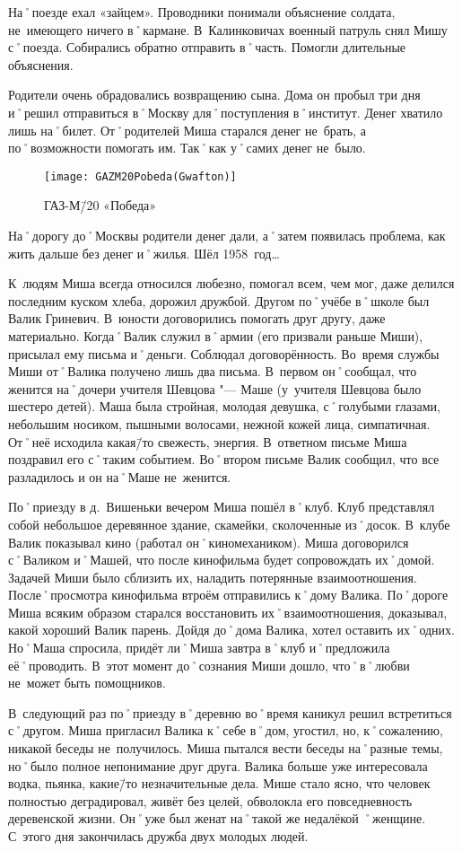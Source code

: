 На˚поезде ехал «зайцем». Проводники понимали объяснение солдата, не~имеющего ничего в˚кармане. В~Калинковичах военный патруль снял Мишу с˚поезда. Собирались обратно отправить в˚часть. Помогли длительные объяснения.

Родители очень обрадовались возвращению сына. Дома он пробыл три дня и˚решил отправиться в˚Москву для˚поступления в˚институт. Денег хватило лишь на˚билет. От˚родителей Миша старался денег не~брать, а по˚возможности помогать им. Так˚как у˚самих денег не~было.

\begin{wrapfigure}{O}{.4\textwidth}
\centering
\texttt{[image: GAZM20Pobeda(Gwafton)]}
\caption[ГАЗ-М\=/20 «Победа»]{ГАЗ-М\=/20 «Победа»\footnotemark}
\label{fig:GAZM20Pobeda(Gwafton)}
\end{wrapfigure}

На˚дорогу до˚Москвы родители денег дали, а˚затем появилась проблема, как жить дальше без денег и˚жилья. Шёл 1958~год…

К~людям Миша всегда относился любезно, помогал всем, чем мог, даже делился последним куском хлеба, дорожил дружбой. Другом по˚учёбе в˚школе был Валик Гриневич. В~юности договорились помогать друг другу, даже материально. Когда˚Валик служил в˚армии (его призвали раньше Миши), присылал ему письма и˚деньги. Соблюдал договорённость. Во~время службы Миши от˚Валика получено лишь два письма. В~первом он˚сообщал, что женится на˚дочери учителя Шевцова "--- Маше (у~учителя Шевцова было шестеро детей). Маша была стройная, молодая девушка, с˚голубыми глазами, небольшим носиком, пышными волосами, нежной кожей лица, симпатичная. От˚неё исходила какая\=/то свежесть, энергия. В~ответном письме Миша поздравил его с˚таким событием. Во˚втором письме Валик сообщил, что все разладилось и он на˚Маше не~женится.

По˚приезду в д.~Вишеньки вечером Миша пошёл в˚клуб. Клуб представлял собой небольшое деревянное здание, скамейки, сколоченные из˚досок. В~клубе Валик показывал кино (работал он˚киномехаником). Миша договорился с˚Валиком и˚Машей, что после кинофильма будет сопровождать их˚домой. Задачей Миши было сблизить их, наладить потерянные взаимоотношения. После˚просмотра кинофильма втроём отправились к˚дому Валика. По˚дороге Миша всяким образом старался восстановить их˚взаимоотношения, доказывал, какой хороший Валик парень. Дойдя до˚дома Валика, хотел оставить их˚одних. Но˚Маша спросила, придёт ли˚Миша завтра в˚клуб и˚предложила её˚проводить. В~этот момент до˚сознания Миши дошло, что˚в˚любви не~может быть помощников.

В~следующий раз по˚приезду в˚деревню во˚время каникул решил встретиться с˚другом. Миша пригласил Валика к˚себе в˚дом, угостил, но, к˚сожалению, никакой беседы не~получилось. Миша пытался вести беседы на˚разные темы, но˚было полное непонимание друг друга. Валика больше уже интересовала водка, пьянка, какие\=/то незначительные дела. Мише стало ясно, что человек полностью деградировал, живёт без целей, обволокла его повседневность деревенской жизни. Он˚уже был женат на˚такой же недалёкой ˚женщине. С~этого дня закончилась дружба двух молодых людей.
